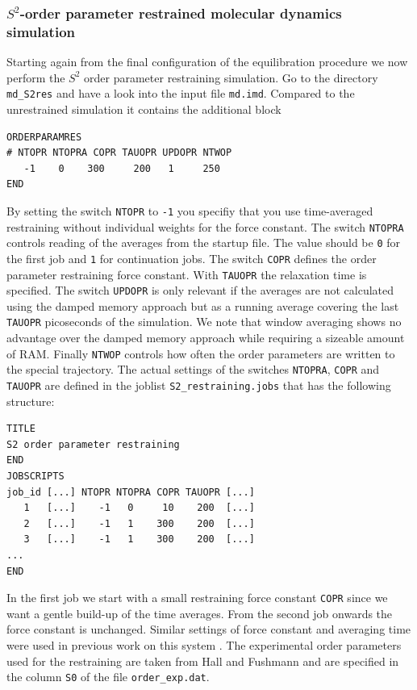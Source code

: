 \subsubsection{$S^2$-order parameter restrained molecular dynamics simulation}

Starting again from the final configuration of the equilibration procedure we now perform the $S^2$ order parameter restraining simulation. Go to the directory \texttt{md\_S2res} and have a look into the input file \texttt{md.imd}. 
Compared to the unrestrained simulation it contains the additional block 

\begin{lstlisting}
ORDERPARAMRES
# NTOPR NTOPRA COPR TAUOPR UPDOPR NTWOP
   -1    0    300     200   1     250
END
\end{lstlisting}
By setting the switch \texttt{NTOPR} to \texttt{-1} you specifiy that you use time-averaged restraining without individual weights for the force constant. The switch \texttt{NTOPRA} controls reading of the 
averages from the startup file. The value should be \texttt{0} for the first job and \texttt{1} for continuation jobs. The switch \texttt{COPR} defines the order parameter restraining force constant. With 
\texttt{TAUOPR} the relaxation time is specified. The switch \texttt{UPDOPR} is only relevant if the averages are not calculated using the damped memory approach but as a running average covering the 
last \texttt{TAUOPR} picoseconds of the simulation. We note that window averaging shows no advantage over the damped memory approach while requiring a sizeable amount of RAM. Finally \texttt{NTWOP}
controls how often the order parameters are written to the special trajectory. 
The actual settings of the switches \texttt{NTOPRA}, \texttt{COPR} and \texttt{TAUOPR} are defined in the joblist \texttt{S2\_restraining.jobs} that has the following structure: 
\begin{lstlisting}
TITLE
S2 order parameter restraining
END
JOBSCRIPTS
job_id [...] NTOPR NTOPRA COPR TAUOPR [...]
   1   [...]    -1   0     10    200  [...]   
   2   [...]    -1   1    300    200  [...] 
   3   [...]    -1   1    300    200  [...] 
... 
END
\end{lstlisting}
In the first job we start with a small restraining force constant \texttt{COPR} since we want a gentle build-up of the time averages. From the second job onwards the force constant is unchanged. Similar settings of force constant and averaging time were used in previous work on this system \cite{Hansen_S2_2014}.
The experimental order parameters used for the restraining are taken from Hall and Fushmann \cite{Hall_2003} and are specified in the column \texttt{S0} of the file \texttt{order\_exp.dat}.
